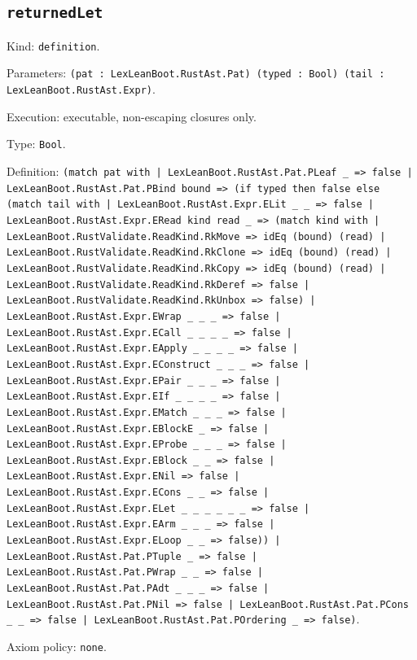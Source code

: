 \documentclass[11pt]{article}
\begin{document}
\subsection*{\texttt{returnedLet}}
\noindent Kind: \texttt{definition}.\par
\noindent Parameters: \texttt{(pat : LexLeanBoot.RustAst.Pat) (typed : Bool) (tail : LexLeanBoot.RustAst.Expr)}.\par
\noindent Execution: executable, non-escaping closures only.\par
\noindent Type: \texttt{Bool}.\par
\noindent Definition: \texttt{(match pat with | LexLeanBoot.RustAst.Pat.PLeaf \_ => false | LexLeanBoot.RustAst.Pat.PBind bound => (if typed then false else (match tail with | LexLeanBoot.RustAst.Expr.ELit \_ \_ => false | LexLeanBoot.RustAst.Expr.ERead kind read \_ => (match kind with | LexLeanBoot.RustValidate.ReadKind.RkMove => idEq (bound) (read) | LexLeanBoot.RustValidate.ReadKind.RkClone => idEq (bound) (read) | LexLeanBoot.RustValidate.ReadKind.RkCopy => idEq (bound) (read) | LexLeanBoot.RustValidate.ReadKind.RkDeref => false | LexLeanBoot.RustValidate.ReadKind.RkUnbox => false) | LexLeanBoot.RustAst.Expr.EWrap \_ \_ \_ => false | LexLeanBoot.RustAst.Expr.ECall \_ \_ \_ \_ => false | LexLeanBoot.RustAst.Expr.EApply \_ \_ \_ \_ => false | LexLeanBoot.RustAst.Expr.EConstruct \_ \_ \_ => false | LexLeanBoot.RustAst.Expr.EPair \_ \_ \_ => false | LexLeanBoot.RustAst.Expr.EIf \_ \_ \_ \_ => false | LexLeanBoot.RustAst.Expr.EMatch \_ \_ \_ => false | LexLeanBoot.RustAst.Expr.EBlockE \_ => false | LexLeanBoot.RustAst.Expr.EProbe \_ \_ \_ => false | LexLeanBoot.RustAst.Expr.EBlock \_ \_ => false | LexLeanBoot.RustAst.Expr.ENil => false | LexLeanBoot.RustAst.Expr.ECons \_ \_ => false | LexLeanBoot.RustAst.Expr.ELet \_ \_ \_ \_ \_ \_ => false | LexLeanBoot.RustAst.Expr.EArm \_ \_ \_ => false | LexLeanBoot.RustAst.Expr.ELoop \_ \_ => false)) | LexLeanBoot.RustAst.Pat.PTuple \_ => false | LexLeanBoot.RustAst.Pat.PWrap \_ \_ => false | LexLeanBoot.RustAst.Pat.PAdt \_ \_ \_ => false | LexLeanBoot.RustAst.Pat.PNil => false | LexLeanBoot.RustAst.Pat.PCons \_ \_ => false | LexLeanBoot.RustAst.Pat.POrdering \_ => false)}.\par
\noindent Axiom policy: \texttt{none}.\par
\end{document}

